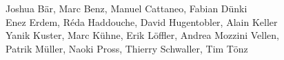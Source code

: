 %
%
%
Joshua Bär,			%
Marc Benz,			%
Manuel Cattaneo,		%
Fabian Dünki%
\\
Enez Erdem,			%
Réda Haddouche,			%
David Hugentobler,		%
Alain Keller%
\\
Yanik Kuster,			%
Marc Kühne,			%
Erik Löffler,			%
Andrea Mozzini Vellen,		%
\\
Patrik Müller,			%
Naoki Pross,			%
Thierry Schwaller,		%
Tim Tönz			%

